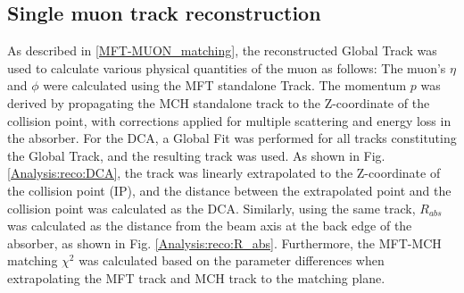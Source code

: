     \subsection{Single muon track reconstruction}
    \label{Single_reco}
        As described in \ref{MFT-MUON_matching}, the reconstructed Global Track was used to calculate various physical quantities of the muon as follows: The muon's $\eta$ and $\phi$ were calculated using the MFT standalone Track. The momentum $p$ was derived by propagating the MCH standalone track to the Z-coordinate of the collision point, with corrections applied for multiple scattering and energy loss in the absorber.
        For the DCA, a Global Fit was performed for all tracks constituting the Global Track, and the resulting track was used. As shown in Fig. \ref{Analysis:reco:DCA}, the track was linearly extrapolated to the Z-coordinate of the collision point (IP), and the distance between the extrapolated point and the collision point was calculated as the DCA. Similarly, using the same track, $R_{abs}$ was calculated as the distance from the beam axis at the back edge of the absorber, as shown in Fig. \ref{Analysis:reco:R_abs}.\@
        Furthermore, the MFT-MCH matching $\chi^2$ was calculated based on the parameter differences when extrapolating the MFT track and MCH track to the matching plane.
